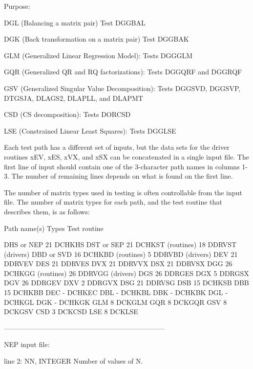 \begin{DoxyParagraph}{Purpose\+: }
\begin{DoxyVerb}
 DGL (Balancing a matrix pair)
     Test DGGBAL

 DGK (Back transformation on a matrix pair)
     Test DGGBAK

 GLM (Generalized Linear Regression Model):
     Tests DGGGLM

 GQR (Generalized QR and RQ factorizations):
     Tests DGGQRF and DGGRQF

 GSV (Generalized Singular Value Decomposition):
     Tests DGGSVD, DGGSVP, DTGSJA, DLAGS2, DLAPLL, and DLAPMT

 CSD (CS decomposition):
     Tests DORCSD

 LSE (Constrained Linear Least Squares):
     Tests DGGLSE

 Each test path has a different set of inputs, but the data sets for
 the driver routines xEV, xES, xVX, and xSX can be concatenated in a
 single input file.  The first line of input should contain one of the
 3-character path names in columns 1-3.  The number of remaining lines
 depends on what is found on the first line.

 The number of matrix types used in testing is often controllable from
 the input file.  The number of matrix types for each path, and the
 test routine that describes them, is as follows:

 Path name(s)  Types    Test routine

 DHS or NEP      21     DCHKHS
 DST or SEP      21     DCHKST (routines)
                 18     DDRVST (drivers)
 DBD or SVD      16     DCHKBD (routines)
                  5     DDRVBD (drivers)
 DEV             21     DDRVEV
 DES             21     DDRVES
 DVX             21     DDRVVX
 DSX             21     DDRVSX
 DGG             26     DCHKGG (routines)
                 26     DDRVGG (drivers)
 DGS             26     DDRGES
 DGX              5     DDRGSX
 DGV             26     DDRGEV
 DXV              2     DDRGVX
 DSG             21     DDRVSG
 DSB             15     DCHKSB
 DBB             15     DCHKBB
 DEC              -     DCHKEC
 DBL              -     DCHKBL
 DBK              -     DCHKBK
 DGL              -     DCHKGL
 DGK              -     DCHKGK
 GLM              8     DCKGLM
 GQR              8     DCKGQR
 GSV              8     DCKGSV
 CSD              3     DCKCSD
 LSE              8     DCKLSE

-----------------------------------------------------------------------

 NEP input file:

 line 2:  NN, INTEGER
          Number of values of N.


\end{DoxyVerb}
\end{DoxyParagraph}
